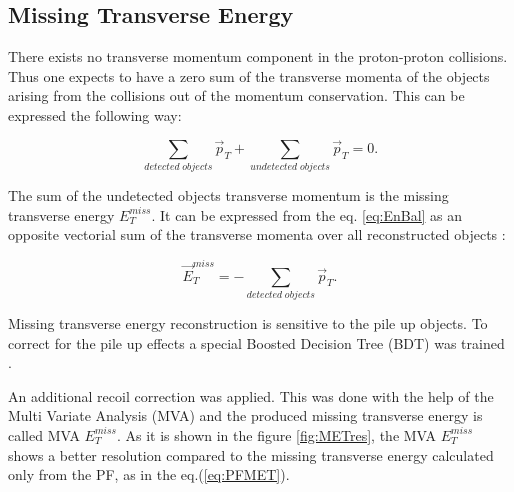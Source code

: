 \subsection{Missing Transverse Energy}

There exists no transverse momentum component in the proton-proton collisions. Thus one expects to have a zero sum of the transverse momenta of the 
objects arising from the collisions out of the momentum conservation. This can be expressed the following way:

\begin{equation}\label{eq:EnBal}
 \sum_{detected\; objects} \vec{p}_{T} + \sum_{undetected\; objects} \vec{p}_{T} = 0.
\end{equation}

The sum of the undetected objects transverse momentum is the missing transverse energy $E_{T}^{miss}$.
It can be expressed from the eq. \ref{eq:EnBal} as an opposite vectorial sum of the transverse momenta over all reconstructed objects \cite{CMS-PAS-PFT-09-001}:

\begin{equation}\label{eq:PFMET}
 \vec{E}^{miss}_{T} = - \sum_{detected\; objects} \vec{p}_{T}.
\end{equation}


Missing transverse energy reconstruction is sensitive to the pile up objects. To correct for the 
pile up effects a special Boosted Decision Tree (BDT) was trained \cite{CMS-PAS-JME-12-002}.

An additional recoil correction\cite{TWikiMET} was applied. This was done with the help of the 
Multi Variate Analysis (MVA) and the produced missing transverse energy is called MVA $E_{T}^{miss}$.
As it is shown in the figure \ref{fig:METres}, the MVA $E_{T}^{miss}$ shows a better resolution compared to the 
missing transverse energy calculated only from the PF, as in the eq.(\ref{eq:PFMET}).

